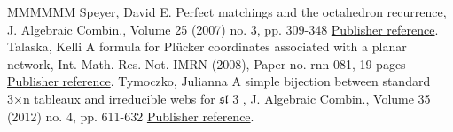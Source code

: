 \begin{thebibliography}{MMMMMM}
 Speyer, David E. Perfect matchings and the octahedron recurrence, J. Algebraic Combin., Volume 25 (2007) no. 3, pp. 309-348 \href{https://alco.centre-mersenne.org/articles/10.5802/alco.376/#octahedron}{Publisher reference}.
 Talaska, Kelli A formula for Plücker coordinates associated with a planar network, Int. Math. Res. Not. IMRN (2008), Paper no. rnn 081, 19 pages \href{https://alco.centre-mersenne.org/articles/10.5802/alco.376/#Tal}{Publisher reference}.
 Tymoczko, Julianna A simple bijection between standard 3×n tableaux and irreducible webs for \(\mathfrak{s}\)\(\mathfrak{l}\) 3 , J. Algebraic Combin., Volume 35 (2012) no. 4, pp. 611-632 \href{https://alco.centre-mersenne.org/articles/10.5802/alco.376/#tymo}{Publisher reference}.
\end{thebibliography}
